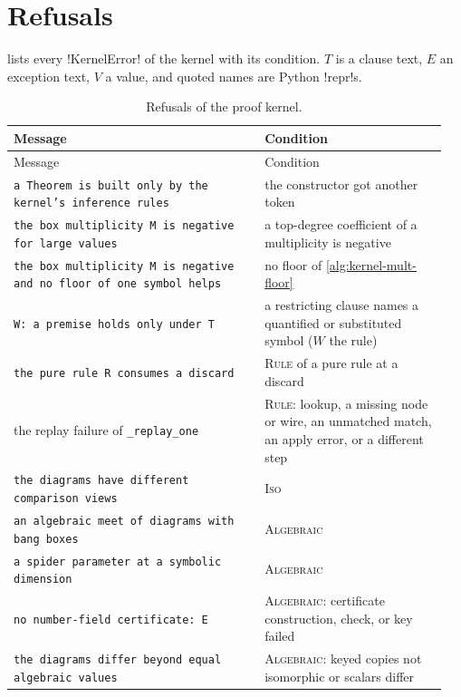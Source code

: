 \section{Refusals}\label{sec:kernel-refusals}

 lists every \py!KernelError! of the kernel with its condition. $T$ is a clause text, $E$ an exception text, $V$ a value, and quoted names are Python \py!repr!s.

\begin{small}
\begin{longtable}{@{}>{\raggedright\arraybackslash}p{0.55\linewidth}>{\raggedright\arraybackslash}p{0.4\linewidth}@{}}
\caption{Refusals of the proof kernel.}\label{tab:kernel-refusals}\\
\toprule
Message & Condition \\
\midrule
\endfirsthead
\toprule
Message & Condition \\
\midrule
\endhead
\bottomrule
\endfoot
\texttt{a Theorem is built only by the kernel's inference rules} & the constructor got another token \\
\texttt{the box multiplicity M is negative for large values} & a top-degree coefficient of a multiplicity is negative \\
\texttt{the box multiplicity M is negative and no floor of one symbol helps} & no floor of \cref{alg:kernel-mult-floor} \\
\texttt{W: a premise holds only under T} & a restricting clause names a quantified or substituted symbol ($W$ the rule) \\
\texttt{the pure rule R consumes a discard} & \textsc{Rule} of a pure rule at a discard \\
the replay failure of \texttt{\_replay\_one} & \textsc{Rule}: lookup, a missing node or wire, an unmatched match, an apply error, or a different step \\
\texttt{the diagrams have different comparison views} & \textsc{Iso} \\
\texttt{an algebraic meet of diagrams with bang boxes} & \textsc{Algebraic} \\
\texttt{a spider parameter at a symbolic dimension} & \textsc{Algebraic} \\
\texttt{no number-field certificate: E} & \textsc{Algebraic}: certificate construction, check, or key failed \\
\texttt{the diagrams differ beyond equal algebraic values} & \textsc{Algebraic}: keyed copies not isomorphic or scalars differ \\

\end{longtable}
\end{small}
